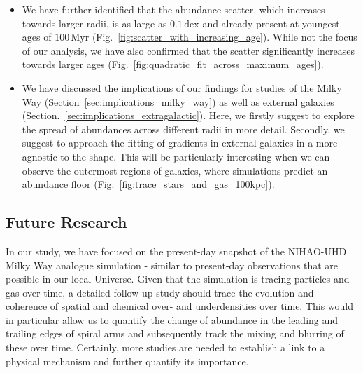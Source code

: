\documentclass[fleqn,usenatbib]{mnras}
\begin{document}
\begin{itemize}
    \item We have further identified that the abundance scatter, which increases towards larger radii, is as large as $0.1\,\mathrm{dex}$ and already present at youngest ages of $100\,\mathrm{Myr}$ (Fig.~\ref{fig:scatter_with_increasing_age}). While not the focus of our analysis, we have also confirmed that the scatter significantly increases towards larger ages (Fig.~\ref{fig:quadratic_fit_across_maximum_ages}).
    \item We have discussed the implications of our findings for studies of the Milky Way (Section~\ref{sec:implications_milky_way}) as well as external galaxies (Section.~\ref{sec:implications_extragalactic}). Here, we firstly suggest to explore the spread of abundances across different radii in more detail. Secondly, we suggest to approach the fitting of gradients in external galaxies in a more agnostic to the shape. This will be particularly interesting when we can observe the outermost regions of galaxies, where simulations predict an abundance floor (Fig.~\ref{fig:trace_stars_and_gas_100kpc}).
\end{itemize}

\subsection{Future Research} \label{sec:future_research}

In our study, we have focused on the present-day snapshot of the NIHAO-UHD Milky Way analogue simulation - similar to present-day observations that are possible in our local Universe. Given that the simulation is tracing particles and gas over time, a detailed follow-up study should trace the evolution and coherence of spatial and chemical over- and underdensities over time. This would in particular allow us to quantify the change of abundance in the leading and trailing edges of spiral arms and subsequently track the mixing and blurring of these over time. Certainly, more studies are needed to establish a link to a physical mechanism and further quantify its importance.
\end{document}
